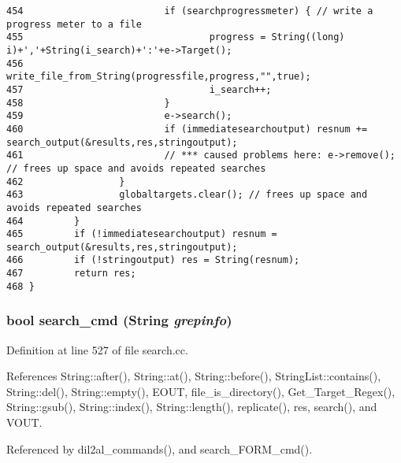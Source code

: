\begin{verbatim}
454                         if (searchprogressmeter) { // write a progress meter to a file
455                                 progress = String((long) i)+','+String(i_search)+':'+e->Target();
456                                 write_file_from_String(progressfile,progress,"",true);
457                                 i_search++;
458                         }
459                         e->search();
460                         if (immediatesearchoutput) resnum += search_output(&results,res,stringoutput);
461                         // *** caused problems here: e->remove(); // frees up space and avoids repeated searches
462                 }
463                 globaltargets.clear(); // frees up space and avoids repeated searches
464         }
465         if (!immediatesearchoutput) resnum = search_output(&results,res,stringoutput);
466         if (!stringoutput) res = String(resnum);
467         return res;
468 }
\end{verbatim}\normalsize 
{}
\subsubsection{\setlength{\rightskip}{0pt plus 5cm}bool search\_\-cmd ({\bf String} {\em grepinfo})}\label{search_8cc_a5}




Definition at line 527 of file search.cc.

References String::after(), String::at(), String::before(), String\-List::contains(), String::del(), String::empty(), EOUT, file\_\-is\_\-directory(), Get\_\-Target\_\-Regex(), String::gsub(), String::index(), String::length(), replicate(), res, search(), and VOUT.

Referenced by dil2al\_\-commands(), and search\_\-FORM\_\-cmd().



